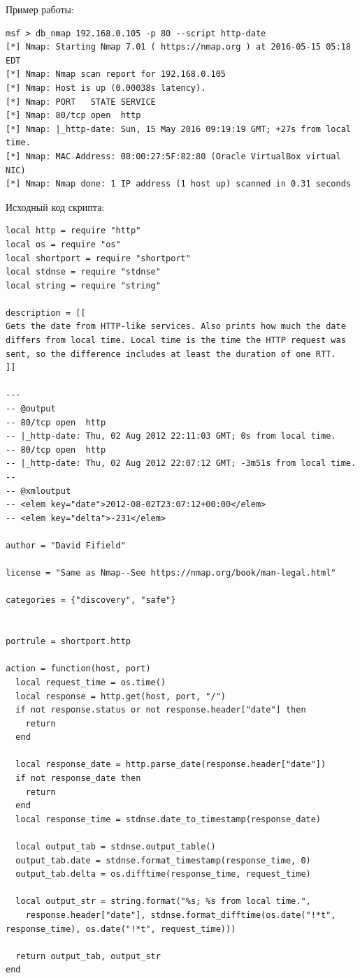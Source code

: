 \documentclass[12pt,a4paper]{report}
\begin{document}
Пример работы:
\begin{lstlisting}[breaklines]
msf > db_nmap 192.168.0.105 -p 80 --script http-date
[*] Nmap: Starting Nmap 7.01 ( https://nmap.org ) at 2016-05-15 05:18 EDT
[*] Nmap: Nmap scan report for 192.168.0.105
[*] Nmap: Host is up (0.00038s latency).
[*] Nmap: PORT   STATE SERVICE
[*] Nmap: 80/tcp open  http
[*] Nmap: |_http-date: Sun, 15 May 2016 09:19:19 GMT; +27s from local time.
[*] Nmap: MAC Address: 08:00:27:5F:82:80 (Oracle VirtualBox virtual NIC)
[*] Nmap: Nmap done: 1 IP address (1 host up) scanned in 0.31 seconds
\end{lstlisting}

Исходный код скрипта:
\begin{lstlisting}[breaklines]
local http = require "http"
local os = require "os"
local shortport = require "shortport"
local stdnse = require "stdnse"
local string = require "string"

description = [[
Gets the date from HTTP-like services. Also prints how much the date
differs from local time. Local time is the time the HTTP request was
sent, so the difference includes at least the duration of one RTT.
]]

---
-- @output
-- 80/tcp open  http
-- |_http-date: Thu, 02 Aug 2012 22:11:03 GMT; 0s from local time.
-- 80/tcp open  http
-- |_http-date: Thu, 02 Aug 2012 22:07:12 GMT; -3m51s from local time.
--
-- @xmloutput
-- <elem key="date">2012-08-02T23:07:12+00:00</elem>
-- <elem key="delta">-231</elem>

author = "David Fifield"

license = "Same as Nmap--See https://nmap.org/book/man-legal.html"

categories = {"discovery", "safe"}


portrule = shortport.http

action = function(host, port)
  local request_time = os.time()
  local response = http.get(host, port, "/")
  if not response.status or not response.header["date"] then
    return
  end

  local response_date = http.parse_date(response.header["date"])
  if not response_date then
    return
  end
  local response_time = stdnse.date_to_timestamp(response_date)

  local output_tab = stdnse.output_table()
  output_tab.date = stdnse.format_timestamp(response_time, 0)
  output_tab.delta = os.difftime(response_time, request_time)

  local output_str = string.format("%s; %s from local time.",
    response.header["date"], stdnse.format_difftime(os.date("!*t", response_time), os.date("!*t", request_time)))

  return output_tab, output_str
end
\end{lstlisting}
\end{document}
